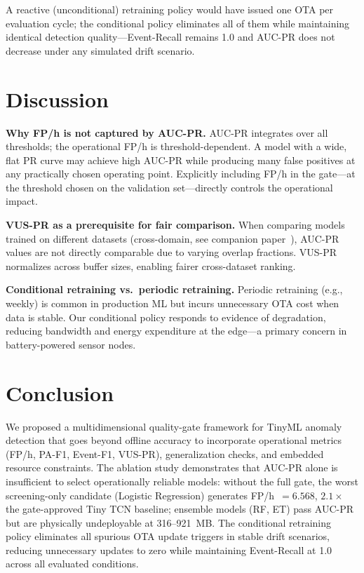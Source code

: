 \documentclass[conference]{IEEEtran}
\begin{document}
A reactive (unconditional) retraining policy would have issued one OTA per
evaluation cycle; the conditional policy eliminates all of them while
maintaining identical detection quality---Event-Recall remains 1.0 and
AUC-PR does not decrease under any simulated drift scenario.

\section{Discussion}
\label{sec:discussion}

\textbf{Why FP/h is not captured by AUC-PR.}
AUC-PR integrates over all thresholds; the operational FP/h is threshold-dependent.
A model with a wide, flat PR curve may achieve high AUC-PR while producing
many false positives at any practically chosen operating point.
Explicitly including FP/h in the gate---at the threshold chosen on the
validation set---directly controls the operational impact.

\textbf{VUS-PR as a prerequisite for fair comparison.}
When comparing models trained on different datasets (cross-domain,
see companion paper~\cite{artigo3}), AUC-PR values are not directly
comparable due to varying overlap fractions.
VUS-PR normalizes across buffer sizes, enabling fairer cross-dataset ranking.

\textbf{Conditional retraining vs.\ periodic retraining.}
Periodic retraining (e.g., weekly) is common in production ML but
incurs unnecessary OTA cost when data is stable.
Our conditional policy responds to evidence of degradation, reducing
bandwidth and energy expenditure at the edge---a primary concern in
battery-powered sensor nodes.

\section{Conclusion}
\label{sec:conclusion}

We proposed a multidimensional quality-gate framework for TinyML anomaly
detection that goes beyond offline accuracy to incorporate operational
metrics (FP/h, PA-F1, Event-F1, VUS-PR), generalization checks, and
embedded resource constraints.
The ablation study demonstrates that AUC-PR alone is insufficient to
select operationally reliable models: without the full gate, the worst
screening-only candidate (Logistic Regression) generates FP/h~$=6.568$,
$2.1\times$ the gate-approved Tiny TCN baseline; ensemble models (RF, ET)
pass AUC-PR but are physically undeployable at 316--921~MB.
The conditional retraining policy eliminates all spurious OTA update triggers
in stable drift scenarios, reducing unnecessary updates to zero while
maintaining Event-Recall at 1.0 across all evaluated conditions.
\end{document}
